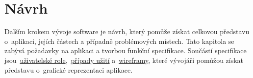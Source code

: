 \chapter{Návrh}
\label{ch:design}
Dalším krokem vývoje software je návrh, který pomůže získat celkovou představu o~aplikaci, jejích částech a případně problémových místech. Tato kapitola se zabývá požadavky na aplikaci a tvorbou funkční specifikace. Součástí specifikace jsou~\hyperref[sc:user_roles]{uživatelské role},~\hyperref[sc:use_cases]{případy užití} a~\hyperref[sc:wireframes]{wireframy}, které vývojáři pomůžou získat představu o~grafické reprezentaci aplikace.







\newpage




